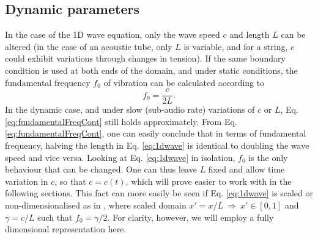 \subsection{Dynamic parameters}\label{sec:dynamicParamsCont}
In the case of the 1D wave equation, only the wave speed $c$ and length $L$ can be altered (in the case of an acoustic tube, only $L$ is variable, and for a string, $c$ could exhibit variations through changes in tension). If the same boundary condition is used at both ends of the domain, and under static conditions, the fundamental frequency $f_0$ of vibration can be calculated according to
\begin{equation}\label{eq:fundamentalFreqCont}
    f_0 = \frac{c}{2L}.
\end{equation}
In the dynamic case, and under slow (sub-audio rate) variations of $c$ or $L$, Eq. \eqref{eq:fundamentalFreqCont} still holds approximately.
%
From Eq. \eqref{eq:fundamentalFreqCont}, one can easily conclude that in terms of fundamental frequency, halving the length in Eq. \eqref{eq:1dwave} is identical to doubling the wave speed and vice versa. Looking at Eq. \eqref{eq:1dwave} in isolation, $f_0$ is the only behaviour that can be changed. One can thus leave $L$ fixed %
and allow time variation in $c$, so that $c = c(t)$, which will prove easier to work with in the following sections. This fact can more easily be seen if Eq. \eqref{eq:1dwave} is scaled or non-dimensionalised as in \cite{bilbao2009}, where scaled domain  $x' = x/L\  \Rightarrow \ x'\in[0, 1]$ and $\gamma = c/L$ such that $f_0 = \gamma / 2$. For clarity, however, we will employ a fully dimensional representation here.
